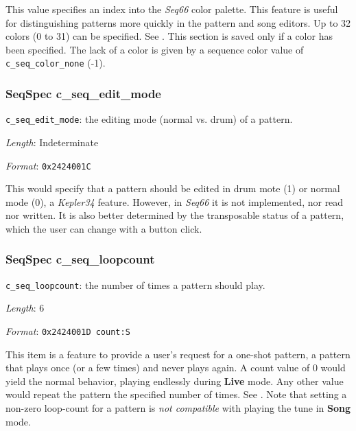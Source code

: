    This value specifies an index into the \textsl{Seq66} color palette.
   This feature is useful for distinguishing patterns more quickly in the
   pattern and song editors. Up to 32 colors (0 to 31) can be specified.
   See .
   This section is saved only if a color has been specified.
   The lack of a color is given by a sequence color value of
   \texttt{c\_seq\_color\_none} (-1).

\subsubsection{SeqSpec c\_seq\_edit\_mode}
\label{subsubsec:midi_format_track_seqspec_seq_edit_mode}

   \begin{description}
      \item \texttt{c\_seq\_edit\_mode}:
         the editing mode (normal vs. drum) of a pattern.
      \item \textsl{Length}: Indeterminate
      \item \textsl{Format}: \texttt{0x2424001C}
   \end{description}

   This would specify that a pattern should be edited in drum
   mote (1) or normal mode (0), a \textsl{Kepler34} feature.
   However, in \textsl{Seq66} it is not implemented, nor read nor written.
   It is also better determined by the transposable status of a pattern,
   which the user can change with a button click.

\subsubsection{SeqSpec c\_seq\_loopcount}
\label{subsubsec:midi_format_track_seqspec_seq_loopcount}

   \begin{description}
      \item \texttt{c\_seq\_loopcount}:
         the number of times a pattern should play.
      \item \textsl{Length}: 6
      \item \textsl{Format}: \texttt{0x2424001D count:S}
   \end{description}

   This item is a feature to provide a user's request for a one-shot
   pattern, a pattern that plays once (or a few times)
   and never plays again.  A count value of 0 would yield
   the normal behavior, playing endlessly during \textbf{Live} mode.
   Any other value would repeat the pattern the specified number of times.
   See .
   Note that setting a non-zero loop-count for a pattern is
   \textsl{not compatible} with playing the tune in \textbf{Song} mode.

